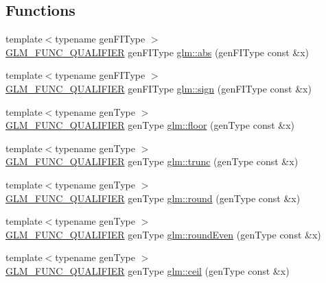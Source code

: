 \subsection*{Functions}
\begin{DoxyCompactItemize}
\item 
{\footnotesize template$<$typename gen\+F\+I\+Type $>$ }\\\hyperlink{setup_8hpp_a33fdea6f91c5f834105f7415e2a64407}{G\+L\+M\+\_\+\+F\+U\+N\+C\+\_\+\+Q\+U\+A\+L\+I\+F\+I\+ER} gen\+F\+I\+Type \hyperlink{namespaceglm_a5c82b1e2a9cb12b4a70d22a8f987273d}{glm\+::abs} (gen\+F\+I\+Type const \&x)
\item 
{\footnotesize template$<$typename gen\+F\+I\+Type $>$ }\\\hyperlink{setup_8hpp_a33fdea6f91c5f834105f7415e2a64407}{G\+L\+M\+\_\+\+F\+U\+N\+C\+\_\+\+Q\+U\+A\+L\+I\+F\+I\+ER} gen\+F\+I\+Type \hyperlink{namespaceglm_aaa1babcfcb872aa6bf5e701c20ac4fda}{glm\+::sign} (gen\+F\+I\+Type const \&x)
\item 
{\footnotesize template$<$typename gen\+Type $>$ }\\\hyperlink{setup_8hpp_a33fdea6f91c5f834105f7415e2a64407}{G\+L\+M\+\_\+\+F\+U\+N\+C\+\_\+\+Q\+U\+A\+L\+I\+F\+I\+ER} gen\+Type \hyperlink{group__core__func__common_ga86350252cc9bf86421317460bbd1f21c}{glm\+::floor} (gen\+Type const \&x)
\item 
{\footnotesize template$<$typename gen\+Type $>$ }\\\hyperlink{setup_8hpp_a33fdea6f91c5f834105f7415e2a64407}{G\+L\+M\+\_\+\+F\+U\+N\+C\+\_\+\+Q\+U\+A\+L\+I\+F\+I\+ER} gen\+Type \hyperlink{group__core__func__common_gadb091aed51e45872f6dc841affa41c5c}{glm\+::trunc} (gen\+Type const \&x)
\item 
{\footnotesize template$<$typename gen\+Type $>$ }\\\hyperlink{setup_8hpp_a33fdea6f91c5f834105f7415e2a64407}{G\+L\+M\+\_\+\+F\+U\+N\+C\+\_\+\+Q\+U\+A\+L\+I\+F\+I\+ER} gen\+Type \hyperlink{group__core__func__common_ga75ebab3fe88a9c5c769135cf5a2649ef}{glm\+::round} (gen\+Type const \&x)
\item 
{\footnotesize template$<$typename gen\+Type $>$ }\\\hyperlink{setup_8hpp_a33fdea6f91c5f834105f7415e2a64407}{G\+L\+M\+\_\+\+F\+U\+N\+C\+\_\+\+Q\+U\+A\+L\+I\+F\+I\+ER} gen\+Type \hyperlink{group__core__func__common_ga6535952553479a4bbca7f1f12a011b17}{glm\+::round\+Even} (gen\+Type const \&x)
\item 
{\footnotesize template$<$typename gen\+Type $>$ }\\\hyperlink{setup_8hpp_a33fdea6f91c5f834105f7415e2a64407}{G\+L\+M\+\_\+\+F\+U\+N\+C\+\_\+\+Q\+U\+A\+L\+I\+F\+I\+ER} gen\+Type \hyperlink{group__core__func__common_gab81e02fff55c9391e28fa47e68c3c903}{glm\+::ceil} (gen\+Type const \&x)

\end{DoxyCompactItemize}
